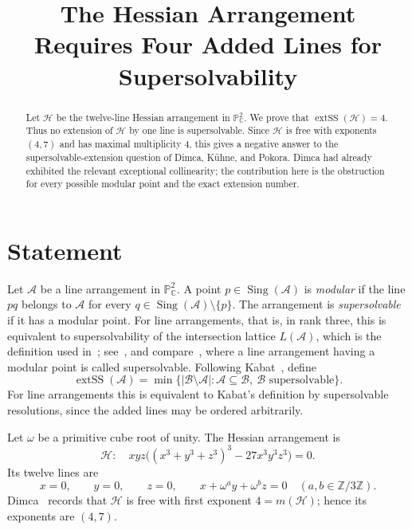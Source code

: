 \documentclass[11pt]{amsart}
\title{The Hessian Arrangement Requires Four Added Lines for Supersolvability}
\date{}
\newcommand{\PP}{\mathbb{P}}
\newcommand{\Sing}{\operatorname{Sing}}
\newcommand{\extSS}{\operatorname{extSS}}
\begin{document}
\begin{abstract}
Let $\mathcal H$ be the twelve-line Hessian arrangement in
$\PP^2_{\mathbb C}$. We prove that $\extSS(\mathcal H)=4$. Thus no
extension of $\mathcal H$ by one line is supersolvable. Since
$\mathcal H$ is free with exponents $(4,7)$ and has maximal
multiplicity $4$, this gives a negative answer to the
supersolvable-extension question of Dimca, K\"uhne, and Pokora.
Dimca had already exhibited the relevant exceptional collinearity;
the contribution here is the obstruction for every possible modular
point and the exact extension number.
\end{abstract}

\maketitle

\section{Statement}

Let $\mathcal A$ be a line arrangement in $\PP^2_{\mathbb C}$. A point
$p\in\Sing(\mathcal A)$ is \emph{modular} if the line $pq$ belongs to
$\mathcal A$ for every $q\in\Sing(\mathcal A)\setminus\{p\}$. The
arrangement is \emph{supersolvable} if it has a modular point. For line
arrangements, that is, in rank three, this is equivalent to
supersolvability of the intersection lattice $L(\mathcal A)$, which is
the definition used in~\cite[Definition~1.1]{Kabat}; see~\cite{OT}, and
compare~\cite{DKP}, where a line arrangement having a modular point is
called supersolvable. Following
Kabat~\cite[Definition~1.3]{Kabat}, define
\[
\extSS(\mathcal A)
 =\min\bigl\{|\mathcal B\setminus\mathcal A|:
 \mathcal A\subseteq\mathcal B,\ \mathcal B\text{ supersolvable}\bigr\}.
\]
For line arrangements this is equivalent to Kabat's definition by
supersolvable resolutions, since the added lines may be ordered
arbitrarily.

Let $\omega$ be a primitive cube root of unity. The Hessian arrangement
is
\begin{equation}\label{eq:Hessian}
\mathcal H:\quad
xyz\bigl((x^3+y^3+z^3)^3-27x^3y^3z^3\bigr)=0.
\end{equation}
Its twelve lines are
\[
x=0,\qquad y=0,\qquad z=0,
\qquad x+\omega^a y+\omega^b z=0
\quad(a,b\in\mathbb Z/3\mathbb Z).
\]
Dimca~\cite[Example~6.5(i)]{Dimca} records that $\mathcal H$ is free
with first exponent $4=m(\mathcal H)$; hence its exponents are $(4,7)$.
\end{document}
